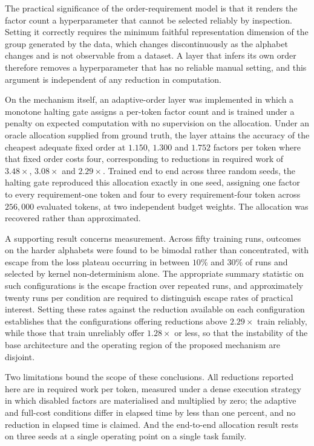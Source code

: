 The practical significance of the order-requirement model is that it renders the
factor count a hyperparameter that cannot be selected reliably by inspection.
Setting it correctly requires the minimum faithful representation dimension of
the group generated by the data, which changes discontinuously as the alphabet
changes and is not observable from a dataset. A layer that infers its own order
therefore removes a hyperparameter that has no reliable manual setting, and this
argument is independent of any reduction in computation.

On the mechanism itself, an adaptive-order layer was implemented in which a
monotone halting gate assigns a per-token factor count and is trained under a
penalty on expected computation with no supervision on the allocation. Under an
oracle allocation supplied from ground truth, the layer attains the accuracy of
the cheapest adequate fixed order at $1.150$, $1.300$ and $1.752$ factors per
token where that fixed order costs four, corresponding to reductions in required
work of $3.48\times$, $3.08\times$ and $2.29\times$. Trained end to end across
three random seeds, the halting gate reproduced this allocation exactly in one
seed, assigning one factor to every requirement-one token and four to every
requirement-four token across $256{,}000$ evaluated tokens, at two independent
budget weights. The allocation was recovered rather than approximated.

A supporting result concerns measurement. Across fifty training runs, outcomes on
the harder alphabets were found to be bimodal rather than concentrated, with
escape from the loss plateau occurring in between $10\%$ and $30\%$ of runs and
selected by kernel non-determinism alone. The appropriate summary statistic on
such configurations is the escape fraction over repeated runs, and approximately
twenty runs per condition are required to distinguish escape rates of practical
interest. Setting these rates against the reduction available on each
configuration establishes that the configurations offering reductions above
$2.29\times$ train reliably, while those that train unreliably offer $1.28\times$
or less, so that the instability of the base architecture and the operating
region of the proposed mechanism are disjoint.

Two limitations bound the scope of these conclusions. All reductions reported
here are in required work per token, measured under a dense execution strategy in
which disabled factors are materialised and multiplied by zero; the adaptive and
full-cost conditions differ in elapsed time by less than one percent, and no
reduction in elapsed time is claimed. And the end-to-end allocation result rests
on three seeds at a single operating point on a single task family.

